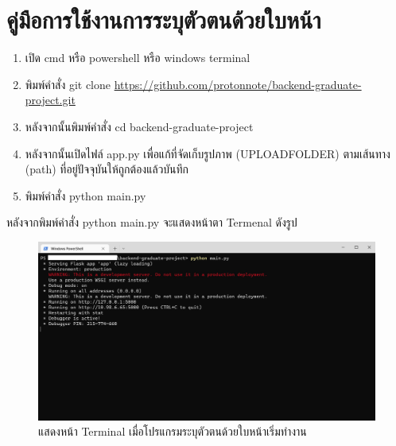 \section{คู่มือการใช้งานการระบุตัวตนด้วยใบหน้า}
\begin{enumerate}
  \item เปิด cmd หรือ powershell หรือ windows terminal
  \item พิมพ์คำสั่ง git clone \url{https://github.com/protonnote/backend-graduate-project.git}
  \item หลังจากนั้นพิมพ์คำสั่ง cd backend-graduate-project
  \item หลังจากนั้นเปิดไฟล์ app.py เพื่อแก้ที่จัดเก็บรูปภาพ (UPLOAD\textunderscore FOLDER) ตามเส้นทาง (path) ที่อยู่ปัจจุบันให้ถูกต้องแล้วบันทึก
  \item พิมพ์คำสั่ง python main.py
\end{enumerate}

หลังจากพิมพ์คำสั่ง python main.py จะแสดงหน้าตา Termenal ดังรูป
\begin{figure}[!ht]
  \begin{center}
    \includegraphics[scale=.4]{pic/server_start.png}
    \caption[แสดงหน้า Terminal เมื่อโปรแกรมระบุตัวตนด้วยใบหน้าเริ่มทำงาน]{แสดงหน้า Terminal เมื่อโปรแกรมระบุตัวตนด้วยใบหน้าเริ่มทำงาน}
    \label{fig:server_start}
  \end{center}
\end{figure}